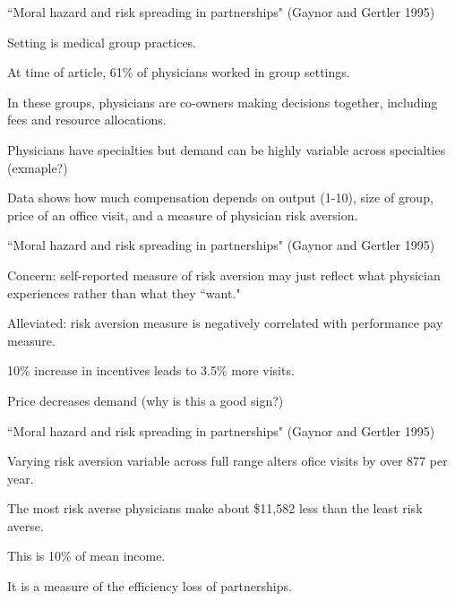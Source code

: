 \documentclass[aspectratio=169,usenames,dvipsnames]{beamer}
\newenvironment{wideitemize}{\itemize\addtolength{\itemsep}{10pt}}{\enditemize}
\begin{document}
\begin{frame}{``Moral hazard and risk spreading in partnerships" (Gaynor and Gertler 1995)}
    \begin{wideitemize}
        \item Setting is medical group practices.
        \item At time of article, 61\% of physicians worked in group settings.
        \item In these groups, physicians are co-owners making decisions together, including fees and resource allocations.
        \item Physicians have specialties but demand can be highly variable across specialties (exmaple?)
        \item Data shows how much compensation depends on output (1-10), size of group, price of an office visit, and a measure of physician risk aversion.
    \end{wideitemize}
\end{frame}


\begin{frame}{``Moral hazard and risk spreading in partnerships" (Gaynor and Gertler 1995)}
    \begin{wideitemize}
        \item Concern: self-reported measure of risk aversion may just reflect what physician experiences rather than what they ``want."
        \item Alleviated: risk aversion measure is negatively correlated with performance pay measure.
        \item 10\% increase in incentives leads to 3.5\% more visits.
        \item Price decreases demand (why is this a good sign?)
    \end{wideitemize}
\end{frame}


\begin{frame}{``Moral hazard and risk spreading in partnerships" (Gaynor and Gertler 1995)}
    \begin{wideitemize}
        \item Varying risk aversion variable across full range alters ofice visits by over 877 per year.
        \item The most risk averse physicians make about \$11,582 less than the least risk averse.
        \item This is 10\% of mean income.
        \item It is a measure of the efficiency loss of partnerships.
    \end{wideitemize}
\end{frame}
\end{document}
